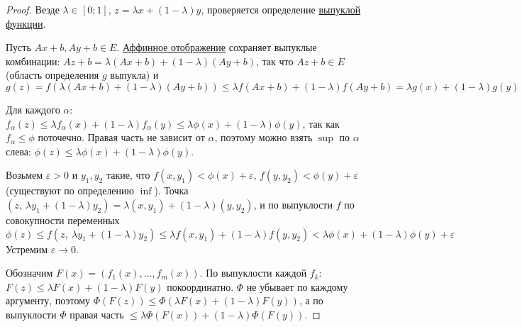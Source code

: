 \begin{proof}
  Везде $\lambda \in [0;1]$, $z = \lambda x + (1-\lambda) y$, проверяется определение \hyperref[note:1CA14F2C-637F-41DE-9E97-72075D19E97F]{выпуклой функции}.

  Пусть $Ax + b, Ay + b \in E$. \hyperref[note:B9EF495E-CDBE-4E80-B401-8AFEAB0DCCAC]{Аффинное отображение} сохраняет выпуклые комбинации: $Az + b = \lambda (Ax + b) + (1-\lambda)(Ay + b)$, так что $Az + b \in E$ (область определения $g$ выпукла) и
  \[
  g(z) = f(\lambda (Ax + b) + (1-\lambda)(Ay + b)) \le \lambda f(Ax + b) + (1-\lambda) f(Ay + b) = \lambda g(x) + (1-\lambda) g(y)
  \]

  Для каждого $\alpha$: $f_{\alpha}(z) \le \lambda f_{\alpha}(x) + (1-\lambda) f_{\alpha}(y) \le \lambda \phi(x) + (1-\lambda) \phi(y)$, так как $f_{\alpha} \le \phi$ поточечно.
  Правая часть не зависит от $\alpha$, поэтому можно взять $\sup$ по $\alpha$ слева: $\phi(z) \le \lambda \phi(x) + (1-\lambda) \phi(y)$.

  Возьмем $\varepsilon > 0$ и $y_1, y_2$ такие, что $f(x, y_1) < \phi(x) + \varepsilon$, $f(y, y_2) < \phi(y) + \varepsilon$ (существуют по определению $\inf$).
  Точка $(z,\ \lambda y_1 + (1-\lambda) y_2) = \lambda (x, y_1) + (1-\lambda)(y, y_2)$, и по выпуклости $f$ по совокупности переменных
  \[
  \phi(z) \le f(z,\ \lambda y_1 + (1-\lambda) y_2) \le \lambda f(x, y_1) + (1-\lambda) f(y, y_2) < \lambda \phi(x) + (1-\lambda) \phi(y) + \varepsilon
  \]
  Устремим $\varepsilon \rightarrow 0$.

  Обозначим $F(x) = (f_1(x), \dots, f_m(x))$. По выпуклости каждой $f_k$: $F(z) \le \lambda F(x) + (1-\lambda) F(y)$ покоординатно.
  $\Phi$ не убывает по каждому аргументу, поэтому $\Phi(F(z)) \le \Phi(\lambda F(x) + (1-\lambda) F(y))$, а по выпуклости $\Phi$ правая часть $\le \lambda \Phi(F(x)) + (1-\lambda) \Phi(F(y))$.
\end{proof}
